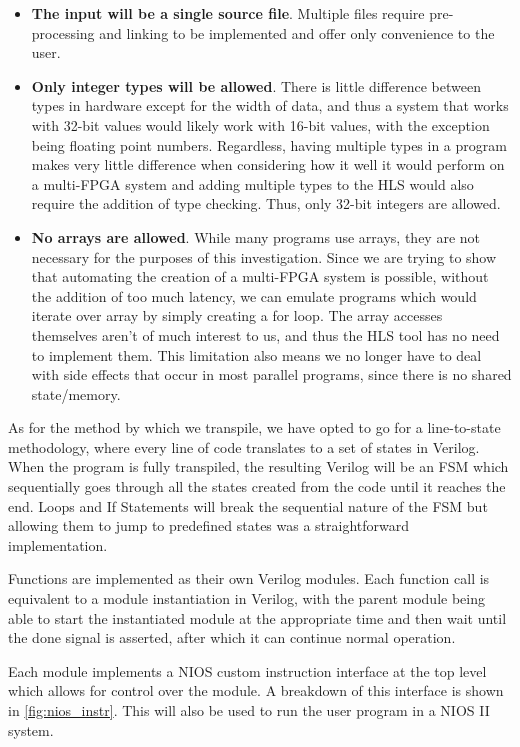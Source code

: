 \begin{itemize}
    \item \textbf{The input will be a single source file}. Multiple files require pre-processing and linking to be implemented and offer only convenience to the user.
    \item \textbf{Only integer types will be allowed}. There is little difference between types in hardware except for the width of data, and thus a system that works with 32-bit values would likely work with 16-bit values, with the exception being floating point numbers. Regardless, having multiple types in a program makes very little difference when considering how it well it would perform on a multi-FPGA system and adding multiple types to the HLS would also require the addition of type checking. Thus, only 32-bit integers are allowed.
    \item \textbf{No arrays are allowed}. While many programs use arrays, they are not necessary for the purposes of this investigation. Since we are trying to show that automating the creation of a multi-FPGA system is possible, without the addition of too much latency, we can emulate programs which would iterate over array by simply creating a for loop. The array accesses themselves aren't of much interest to us, and thus the HLS tool has no need to implement them. This limitation also means we no longer have to deal with side effects that occur in most parallel programs, since there is no shared state/memory.
\end{itemize}

As for the method by which we transpile, we have opted to go for a line-to-state methodology, where every line of code translates to a set of states in Verilog. When the program is fully transpiled, the resulting Verilog will be an FSM which sequentially goes through all the states created from the code until it reaches the end. Loops and If Statements will break the sequential nature of the FSM but allowing them to jump to predefined states was a straightforward implementation.

Functions are implemented as their own Verilog modules. Each function call is equivalent to a module instantiation in Verilog, with the parent module being able to start the instantiated module at the appropriate time and then wait until the done signal is asserted, after which it can continue normal operation.

Each module implements a NIOS custom instruction interface \cite{nios-ii-inst-guide} at the top level which allows for control over the module. A breakdown of this interface is shown in \autoref{fig:nios_instr}. This will also be used to run the user program in a NIOS II system.

